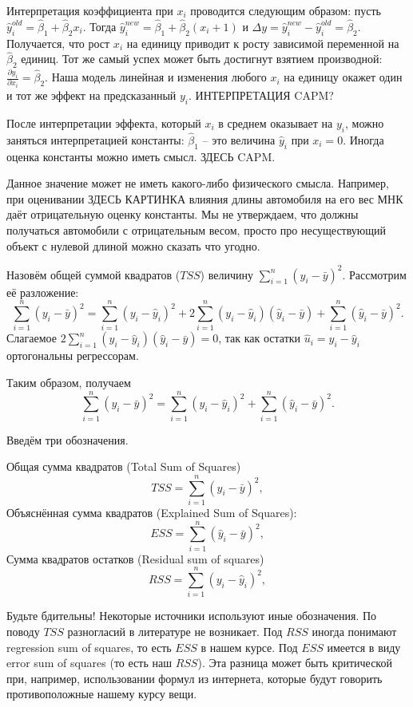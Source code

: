\documentclass[12pt]{article}
\newcommand{\hb}{\hat{\beta}}
\newcommand{\hu}{\hat{u}}
\newcommand{\hy}{\hat{y}}
\newcommand{\RSS}{RSS}
\newcommand{\ESS}{ESS}
\newcommand{\TSS}{TSS}
\begin{document}
Интерпретация коэффициента при $x_i$ проводится следующим образом: пусть $\hy_i^{old} = \hb_1 + \hb_2 x_i$. Тогда $\hy_i^{new} = \hb_1 + \hb_2 (x_i + 1)$ и $\Delta y = \hy_i^{new} - \hy_i^{old} = \hb_2$. Получается, что рост $x_i$ на единицу приводит к росту зависимой переменной на $\hb_2$ единиц. Тот же самый успех может быть достигнут взятием производной: $\frac{\partial \hy_i}{\partial x_i} = \hb_2.$ Наша модель линейная и изменения любого $x_i$ на единицу окажет один и тот же эффект на предсказанный $y_i$. ИНТЕРПРЕТАЦИЯ CAPM?

После интерпретации эффекта, который $x_i$ в среднем оказывает на $y_i$, можно заняться интерпретацией константы: $\hb_1$ -- это величина $\hy_i$ при $x_i = 0$. Иногда оценка константы можно иметь смысл. ЗДЕСЬ CAPM.

Данное значение может не иметь какого-либо физического смысла. Например, при оценивании ЗДЕСЬ КАРТИНКА влияния длины автомобиля на его вес МНК даёт отрицательную оценку константы. Мы не утверждаем, что должны получаться автомобили с отрицательным весом, просто про несуществующий объект с нулевой длиной можно сказать что угодно.

Назовём общей суммой квадратов ($\TSS$) величину $\sum_{i=1}^n (y_i - \bar{y})^2$. Рассмотрим её разложение:
\[
\sum_{i=1}^n (y_i - \bar{y})^2 = \sum_{i=1}^n (y_i - \hy_i)^2 + 2\sum_{i=1}^n (y_i - \hy_i)(\hy_i - \bar{y}) + \sum_{i=1}^n (\hy_i - \bar{y})^2.
\]
Слагаемое $2\sum_{i=1}^n (y_i - \hy_i)(\hy_i - \bar{y}) = 0$, так как остатки $\hu_i = y_i - \hy_i$ ортогональны регрессорам.

Таким образом, получаем
\[
\sum_{i=1}^n (y_i - \bar{y})^2 = \sum_{i=1}^n (y_i - \hy_i)^2 + \sum_{i=1}^n (\hy_i - \bar{y})^2.
\]

Введём три обозначения.


Общая сумма квадратов (Total Sum of Squares)
\[
\TSS = \sum_{i=1}^n (y_i - \bar{y})^2,
\]
Объяснённая сумма квадратов (Explained Sum of Squares):
\[
\ESS = \sum_{i=1}^n (\hy_i - \bar{y})^2,
\]
Сумма квадратов остатков (Residual sum of squares)
\[
\RSS = \sum_{i=1}^n (y_i - \hy_i)^2,
\]

Будьте бдительны! 
Некоторые источники используют иные обозначения. По поводу $\TSS$ разногласий в литературе не возникает. Под $\RSS$ иногда понимают regression sum of squares, то есть $\ESS$ в нашем курсе. Под $\ESS$ имеется в виду error sum of squares (то есть наш $\RSS$). Эта разница может быть критической при, например, использовании формул из интернета, которые будут говорить противоположные нашему курсу вещи.
\end{document}
